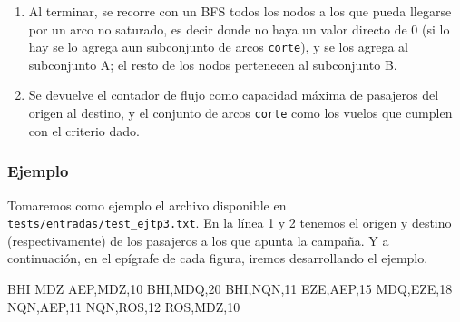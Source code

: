 \documentclass[../tp3_grupo404.tex]{subfiles}
\begin{document}
\begin{enumerate}
\begin{enumerate}
        \item Mientras haya un camino, encontrado con BFS, desde el origen y el destino dados en el archivo,
        cuyos arcos tengan valores mayores que cero:\footnote{Esto es, para un arco directo significa que
        hay un valor residual, el flujo no llegó a su capacidad máxima. para un arco inverso significa que
        hay un flujo en el sentido contrario que podría disminuirse.} \begin{enumerate}
            \item  Busca el cuello de botella (el menor de todos los valores).
            \item Aumenta el camino: Si es un arco directo, aumenta el flujo (reduciendo su "valor" y
            aumentando el del arco inverso asociado); si es un arco inverso, disminuye su flujo (aumentando
            su "valor", y reduciendo el del arco directo, ya que es el valor residual).
            \item Se aumenta un contador interno de flujo aumentado con el valor del cuello de botella.
        \end{enumerate}
    \end{enumerate}
    \item Al terminar, se recorre con un BFS todos los nodos a los que pueda llegarse por un arco no saturado,
        es decir donde no haya un valor directo de 0 (si lo hay se lo agrega aun subconjunto de arcos \texttt{corte}),
        y se los agrega al subconjunto A; el resto de los nodos pertenecen al subconjunto B.
    \item Se devuelve el contador de flujo como capacidad máxima de pasajeros del origen al destino,
    y el conjunto de arcos \texttt{corte} como los vuelos que cumplen con el criterio dado.
\end{enumerate}

\subsubsection{Ejemplo}
Tomaremos como ejemplo el archivo disponible en
\texttt{tests/entradas/test\_ejtp3.txt}. En la línea 1 y 2 tenemos el origen y
destino (respectivamente) de los pasajeros a los que apunta la campaña.
Y a continuación, en el epígrafe de cada figura, iremos desarrollando el ejemplo.

\begin{alternate}[breaklines=true,numbers=left,xleftmargin=5mm]
    BHI
    MDZ
    AEP,MDZ,10
    BHI,MDQ,20
    BHI,NQN,11
    EZE,AEP,15
    MDQ,EZE,18
    NQN,AEP,11
    NQN,ROS,12
    ROS,MDZ,10
\end{alternate}
\end{document}
